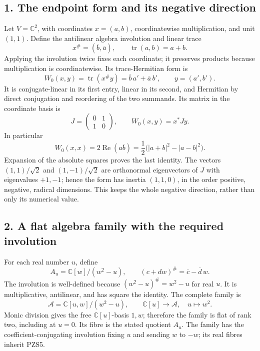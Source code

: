 \documentclass[
  10pt,
  a4paper,
]{article}
\begin{document}
\subsection{1. The endpoint form and its negative
direction}\label{the-endpoint-form-and-its-negative-direction}

Let \(V=\mathbb C^2\), with coordinates \(x=(a,b)\), coordinatewise
multiplication, and unit \((1,1)\). Define the antilinear algebra
involution and linear trace \[
x^\#=(\overline b,\overline a),\qquad
\operatorname{tr}(a,b)=a+b.
\tag{PZS1}
\] Applying the involution twice fixes each coordinate; it preserves
products because multiplication is coordinatewise. Its trace-Hermitian
form is \[
W_0(x,y)=\operatorname{tr}(x^\#y)
=\overline b\,a'+\overline a\,b',
\qquad y=(a',b').
\tag{PZS2}
\] It is conjugate-linear in its first entry, linear in its second, and
Hermitian by direct conjugation and reordering of the two summands. Its
matrix in the coordinate basis is \[
J=\begin{pmatrix}0&1\\1&0\end{pmatrix},
\qquad W_0(x,y)=x^*Jy.
\tag{PZS3}
\] In particular \[
W_0(x,x)=2\operatorname{Re}(a\overline b)
=\frac12\bigl(|a+b|^2-|a-b|^2\bigr).
\tag{PZS4}
\] Expansion of the absolute squares proves the last identity. The
vectors \((1,1)/\sqrt2\) and \((1,-1)/\sqrt2\) are orthonormal
eigenvectors of \(J\) with eigenvalues \(+1,-1\); hence the form has
inertia \((1,1,0)\), in the order positive, negative, radical
dimensions. This keeps the whole negative direction, rather than only
its numerical value.

\subsection{2. A flat algebra family with the required
involution}\label{a-flat-algebra-family-with-the-required-involution}

For each real number \(u\), define \[
A_u=\mathbb C[w]/(w^2-u),\qquad
(c+dw)^\#=\overline c-\overline d\,w.
\tag{PZS5}
\] The involution is well-defined because \((w^2-u)^\#=w^2-u\) for real
\(u\). It is multiplicative, antilinear, and has square the identity.
The complete family is \[
\mathcal A=\mathbb C[u,w]/(w^2-u),\qquad
\mathbb C[u]\longrightarrow\mathcal A,
\quad u\longmapsto w^2.
\tag{PZS6}
\] Monic division gives the free \(\mathbb C[u]\)-basis \(1,w\);
therefore the family is flat of rank two, including at \(u=0\). Its
fibre is the stated quotient \(A_u\). The family has the
coefficient-conjugating involution fixing \(u\) and sending \(w\) to
\(-w\); its real fibres inherit PZS5.
\end{document}
